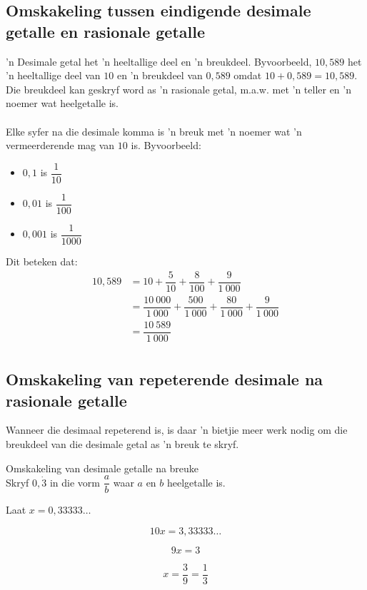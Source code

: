 \subsection*{Omskakeling tussen eindigende desimale getalle en rasionale getalle}
’n Desimale getal het ’n heeltallige deel en ’n breukdeel. Byvoorbeeld, $10,589$ het ’n heeltallige deel van $10$ en ’n
breukdeel van $0,589$ omdat $10+0,589=10,589$. Die breukdeel kan geskryf word as ’n rasionale getal, m.a.w.
met ’n teller en ’n noemer wat heelgetalle is. \\
\\
Elke syfer na die desimale komma is ’n breuk met ’n noemer wat ’n vermeerderende mag van $10$ is. Byvoorbeeld: 
\begin{itemize}
 \item $0,1$ is $\dfrac{1}{10}$
\item $0,01$ is $\dfrac{1}{100}$
\item $0,001$ is $\dfrac{1}{1000}$
\end{itemize}

Dit beteken dat:
\begin{align*}
  10,589 &= 10 + \dfrac{5}{10} + \dfrac{8}{100} + \dfrac{9}{1~000} \\
  &= \dfrac{10~000}{1~000} + \dfrac{500}{1~000} + \dfrac{80}{1~000} + \dfrac{9}{1~000} \\
  &= \dfrac{10~589}{1~000} \\
\end{align*}

\subsection*{Omskakeling van repeterende desimale na rasionale getalle}


Wanneer die desimaal repeterend is, is daar ’n bietjie meer werk nodig om die breukdeel van die desimale getal
as ’n breuk te skryf.\par 

\begin{wex}
{%
Omskakeling van  desimale getalle na breuke
}
{%
\\
Skryf $0,\dot{3}$ in die vorm $\dfrac{a}{b}$ waar $a$ en $b$ heelgetalle is.
}
{%

Laat $x = 0,33333\ldots$



$$10x = 3,33333\ldots$$



$$9x = 3 $$


$$ x = \dfrac{3}{9} = \dfrac{1}{3} $$
}
\end{wex}


